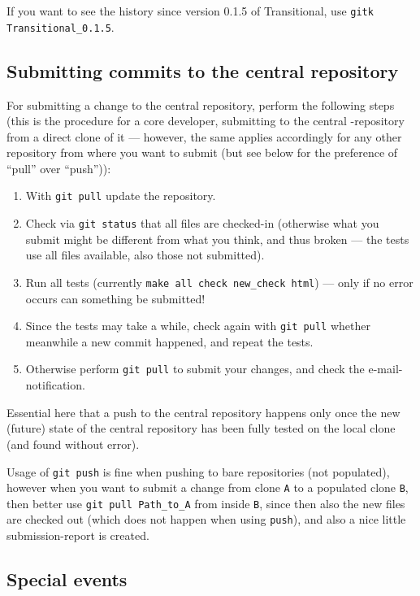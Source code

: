 \documentclass{book}
\begin{document}
If you want to see the history since version 0.1.5 of Transitional, use \texttt{gitk Transitional\_0.1.5}. 




\subsection{Submitting commits to the central repository}
\label{sec:GitSubmittingchanges}

For submitting a change to the central repository, perform the following steps (this is the procedure for a core developer, submitting to the central \OKlibrary-repository from a direct clone of it --- however, the same applies accordingly for any other repository from where you want to submit (but see below for the preference of ``pull'' over ``push'')):
\begin{enumerate}
\item With \texttt{git pull} update the repository.
\item Check via \texttt{git status} that all files are checked-in (otherwise what you submit might be different from what you think, and thus broken --- the tests use all files available, also those not submitted).
\item Run all tests (currently \texttt{make all check new\_check html}) --- only if no error occurs can something be submitted!
\item Since the tests may take a while, check again with \texttt{git pull} whether meanwhile a new commit happened, and repeat the tests.
\item Otherwise perform \texttt{git pull} to submit your changes, and check the e-mail-notification.
\end{enumerate}

Essential here that a push to the central repository happens only once the new (future) state of the central repository has been fully tested on the local clone (and found without error).

Usage of \texttt{git push} is fine when pushing to bare repositories (not populated), however when you want to submit a change from clone \texttt{A} to a populated clone \texttt{B}, then better use \texttt{git pull Path\_to\_A} from inside \texttt{B}, since then also the new files are checked out (which does not happen when using \texttt{push}), and also a nice little submission-report is created.




\subsection{Special events}
\label{sec:GitSpecialevents}
\end{document}
